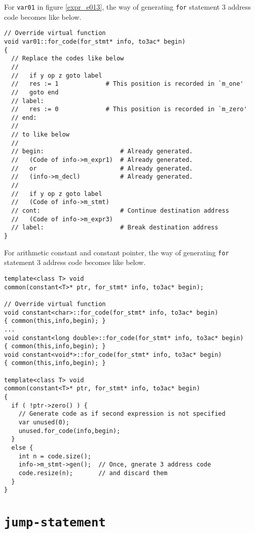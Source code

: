 For {\tt{var01}} in figure \ref{expr_e013},
the way of generating {\tt{for}} statement 3 address code
becomes like below.
\begin{verbatim}
// Override virtual function
void var01::for_code(for_stmt* info, to3ac* begin)
{
  // Replace the codes like below
  //
  //   if y op z goto label
  //   res := 1             # This position is recorded in `m_one'
  //   goto end
  // label:
  //   res := 0             # This position is recorded in `m_zero'
  // end:
  //
  // to like below
  //
  // begin:                     # Already generated.
  //   (Code of info->m_expr1)  # Already generated.
  //   or                       # Already generated.
  //   (info->m_decl)           # Already generated.
  //
  //   if y op z goto label
  //   (Code of info->m_stmt)
  // cont:                      # Continue destination address
  //   (Code of info->m_expr3)
  // label:                     # Break destination address
}
\end{verbatim}
For arithmetic constant and constant pointer,
the way of generating {\tt{for}} statement 3 address code
becomes like below.
\begin{verbatim}
template<class T> void
common(constant<T>* ptr, for_stmt* info, to3ac* begin);

// Override virtual function
void constant<char>::for_code(for_stmt* info, to3ac* begin)
{ common(this,info,begin); }
...
void constant<long double>::for_code(for_stmt* info, to3ac* begin)
{ common(this,info,begin); }
void constant<void*>::for_code(for_stmt* info, to3ac* begin)
{ common(this,info,begin); }

template<class T> void
common(constant<T>* ptr, for_stmt* info, to3ac* begin)
{
  if ( !ptr->zero() ) {
    // Generate code as if second expression is not specified
    var unused(0);
    unused.for_code(info,begin);
  }
  else {
    int n = code.size();
    info->m_stmt->gen();  // Once, gnerate 3 address code
    code.resize(n);       // and discard them
  }
}
\end{verbatim}

\section{\tt{jump-statement}}

